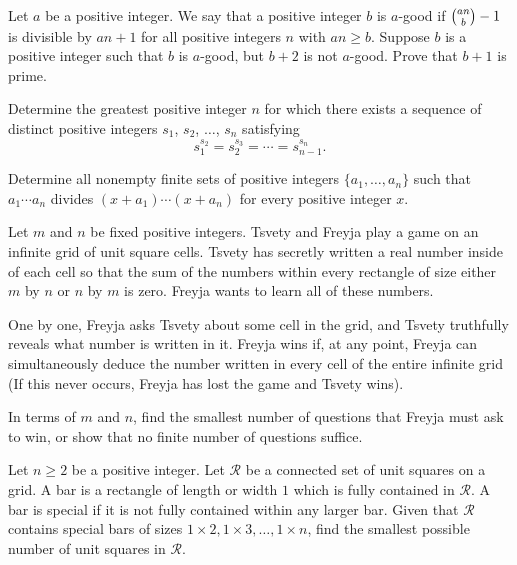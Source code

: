 \documentclass[11pt]{scrartcl}
\begin{document}
\begin{problem}[1440964279096111130]
	Let $a$ be a positive integer. We say that a positive integer $b$ is $a$-good if $\tbinom{an}{b}-1$ is divisible by $an+1$ for all positive integers $n$ with $an \geq b$. Suppose $b$ is a positive integer such that $b$ is $a$-good, but $b+2$ is not $a$-good. Prove that $b+1$ is prime.
\end{problem}
\begin{problem}[740814477661493]
Determine the greatest positive integer \(n\) for which there exists a sequence of distinct positive integers \(s_1\), \(s_2\), \(\ldots\), \(s_n\) satisfying\[s_1^{s_2}=s_2^{s_3}=\cdots=s_{n-1}^{s_n}.\]
\end{problem}
\begin{problem}[6122338123883323140]
	Determine all nonempty finite sets of positive integers $\{a_1, \dots, a_n\}$ such that $a_1 \cdots a_n$ divides $(x + a_1) \cdots (x + a_n)$ for every positive integer $x$.
\end{problem}
\begin{problem}[496656338551810]
Let $m$ and $n$ be fixed positive integers. Tsvety and Freyja play a game on an infinite grid of unit square cells. Tsvety has secretly written a real number inside of each cell so that the sum of the numbers within every rectangle of size either $m$ by $n$ or $n$ by $m$ is zero. Freyja wants to learn all of these numbers.

One by one, Freyja asks Tsvety about some cell in the grid, and Tsvety truthfully reveals what number is written in it. Freyja wins if, at any point, Freyja can simultaneously deduce the number written in every cell of the entire infinite grid (If this never occurs, Freyja has lost the game and Tsvety wins).

In terms of $m$ and $n$, find the smallest number of questions that Freyja must ask to win, or show that no finite number of questions suffice.

\end{problem}
\begin{problem}[5450879444672277193]
Let $n \geq 2$ be a positive integer. Let $\mathcal{R}$ be a connected set of unit squares on a grid. A bar is a rectangle of length or width $1$ which is fully contained in $\mathcal{R}$. A bar is special if it is not fully contained within any larger bar. Given that $\mathcal{R}$ contains special bars of sizes $1 \times 2,1 \times 3,\ldots,1 \times n$, find the smallest possible number of unit squares in $\mathcal{R}$.
\end{problem}
\end{document}
